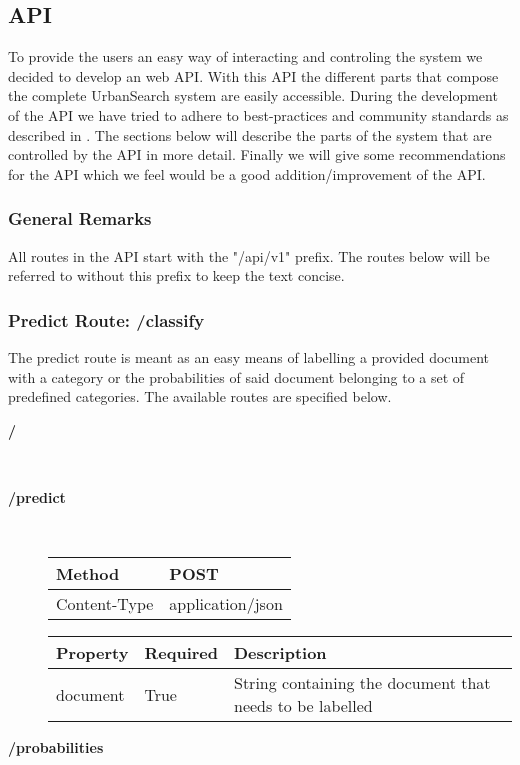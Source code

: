 \subsection{API}
To provide the users an easy way of interacting and controling the system we decided to develop an web API. With this API the different parts that compose the complete UrbanSearch system are easily accessible. During the development of the API we have tried to adhere to best-practices and community standards as described in \cite{apigee}. The sections below will describe the parts of the system that are controlled by the API in more detail. Finally we will give some recommendations for the API which we feel would be a good addition/improvement of the API.

\subsubsection{General Remarks}

All routes in the API start with the "/api/v1" prefix. The routes below will be referred to without this prefix to keep the text concise.

\subsubsection{Predict Route: /classify}
The predict route is meant as an easy means of labelling a provided document with a category or the probabilities of said document belonging to a set of predefined categories.
The available routes are specified below.

\begin{description}
\item[\textbf{/}]\\
\item[\textbf{/predict}]\\
\begin{center}
    \begin{tabular}{ | l | l |}
    \hline
    Method & POST\\ \hline
    Content-Type & application/json\\ \hline
    \end{tabular}
\end{center}


\begin{center}
    \begin{tabular}{ | l | l | l |}
    \hline
    Property & Required & Description\\ \hline
    document & True & String containing the document that needs to be labelled\\ \hline
    \end{tabular}
\end{center}

\item[\textbf{/probabilities}]\\

\end{description}



